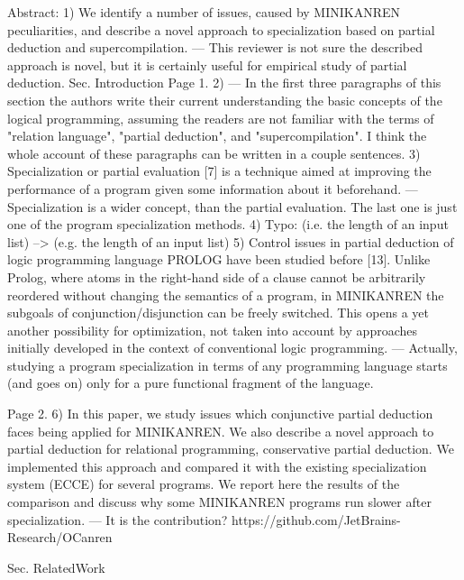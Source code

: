 Abstract:
1) We identify a number of issues, caused by MINIKANREN peculiarities, and describe a novel approach to specialization based on partial deduction and supercompilation.
 --- This reviewer is not sure the described approach is novel, but it is certainly useful for empirical study of partial deduction.
Sec. Introduction
Page 1.
2) --- In the first three paragraphs of this section the authors write their current understanding the basic concepts of the logical programming, assuming the readers are not familiar with the terms of  "relation language", "partial deduction", and "supercompilation". I think the whole account of these paragraphs can be written in a couple sentences.
3) Specialization or partial evaluation [7] is a technique aimed at improving the performance of a program given some information about it beforehand.
 --- Specialization is a wider concept, than the partial evaluation. The last one is just one of the program specialization methods.
4) Typo:
   (i.e. the length of an input list) --> (e.g. the length of an input list)
5) Control issues in partial deduction of logic programming language PROLOG have been studied before [13]. Unlike Prolog, where atoms in the right-hand side of a clause cannot be arbitrarily reordered without changing the semantics of a program, in MINIKANREN the subgoals of conjunction/disjunction can be freely switched. This opens a yet another possibility for optimization, not taken into account by approaches initially developed in the context of conventional logic programming.
 --- Actually, studying a program specialization in terms of any programming language starts (and goes on) only for a pure functional fragment of the language.

Page 2.
6) In this paper, we study issues which conjunctive partial deduction faces being applied for MINIKANREN. We also describe a novel approach to partial deduction for relational programming, conservative partial deduction. We implemented this approach and compared it with the existing specialization system (ECCE) for several programs. We report here the results of the comparison and discuss why some MINIKANREN programs run slower after specialization.
 --- It is the contribution? https://github.com/JetBrains-Research/OCanren

Sec. RelatedWork

